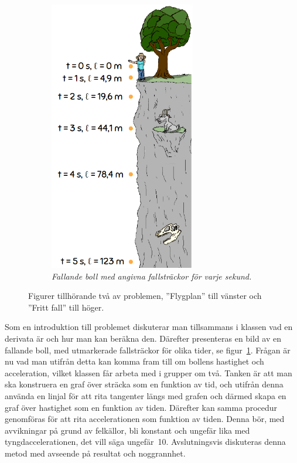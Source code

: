 \begin{figure}
\begin{subfigure}[b]{0.45\textwidth}
        \includegraphics[width=0.7\textwidth]{Figures/FrittFall.PNG}
        \caption{\textsl{Fallande boll med angivna fallsträckor för varje sekund.}}
        \label{fig:FrittFall}
    \end{subfigure}
    \hspace{0.4cm}
    \caption{Figurer tillhörande två av problemen, ''Flygplan'' till vänster och ''Fritt fall'' till höger.}
    \label{fig:three graphs}
\end{figure}
    
    \textcolor{lila}{Som en introduktion till problemet diskuterar man tillsammans i klassen vad en derivata är och hur man kan beräkna den. Därefter presenteras en bild av en fallande boll, med utmarkerade fallsträckor för olika tider, se figur~\ref{fig:FrittFall}. Frågan är nu vad man utifrån detta kan komma fram till om bollens hastighet och acceleration, vilket klassen får arbeta med i grupper om två. Tanken är att man ska konstruera en graf över sträcka som en funktion av tid, och utifrån denna använda en linjal för att rita tangenter längs med grafen och därmed skapa en graf över hastighet som en funktion av tiden. Därefter kan samma procedur genomföras för att rita accelerationen som funktion av tiden. Denna bör, med avvikningar på grund av felkällor, bli konstant och ungefär lika med tyngdaccelerationen, det vill säga ungefär~10. Avslutningsvis diskuteras denna metod med avseende på resultat och noggrannhet.}
    
